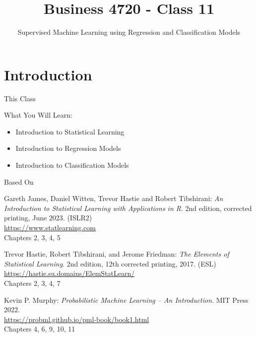 \documentclass[ignorenonframetext,xcolor=x11names]{beamer}
\title{Business 4720 - Class 11}
\subtitle{Supervised Machine Learning using Regression and Classification Models}
\begin{document}
\begin{frame}{}
  \titlepage
  \footnotesize
  
\end{frame}

\section{Introduction}

\begin{frame}{This Class}

\begin{block}{What You Will Learn:}
\begin{itemize}
  \item Introduction to Statistical Learning
  \item Introduction to Regression Models
  \item Introduction to Classification Models
\end{itemize}
\end{block}
\end{frame}

\begin{frame}{Based On}
\small
\begin{block}{}
Gareth James, Daniel Witten, Trevor Hastie and Robert Tibshirani: \emph{An Introduction to Statistical Learning with Applications in R}. 2nd edition, corrected printing, June 2023. (ISLR2) \\
\vspace{1mm}
\url{https://www.statlearning.com} \\
\vspace{1mm}
Chapters 2, 3, 4, 5
\end{block}

\begin{block}{}
Trevor Hastie, Robert Tibshirani, and Jerome Friedman: \emph{The Elements of Statistical Learning}. 2nd edition, 12th corrected printing, 2017. (ESL) \\
\vspace{1mm}
\url{https://hastie.su.domains/ElemStatLearn/} \\
\vspace{1mm}
Chapters 2, 3, 4, 7
\end{block}

\begin{block}{}
Kevin P. Murphy: \emph{Probabilistic Machine Learning -- An Introduction}. MIT Press 2022. \\
\vspace{1mm}
\url{https://probml.github.io/pml-book/book1.html} \\
\vspace{1mm}
Chapters 4, 6, 9, 10, 11
\end{block}
\end{frame}
\end{document}

